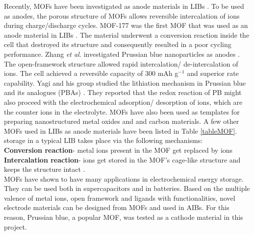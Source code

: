 Recently, MOFs have been investigated as anode materials in LIBs \cite{li_shape-controlled_2006,han_synthesis_2012,zhao_metalorganic_2015}. To be used as anodes, the porous structure of MOFs allows reversible intercalation of  ions during charge/discharge cycles. MOF-177 was the first MOF that was used as an anode material in LIBs \cite{}. The material underwent a conversion reaction inside the cell that destroyed its structure and consequently resulted in a poor cycling performance.  Zhang \textit{et al.} investigated Prussian blue nanoparticles as anodes \cite{nie_prussian_2014}. The open-framework structure allowed rapid intercalation/ de-intercalation of  ions. The cell achieved a reversible capacity of 300 mAh g$^{-1}$ and superior rate capability. Yagi and his group studied the lithiation mechanism in Prussian blue and its analogues (PBAs) \cite{yagi_eqcm_2014}. They reported that the redox reaction of PB might also proceed with the electrochemical adsorption/ desorption of  ions, which are the counter ions in the electrolyte. MOFs have also been used as templates for preparing nanostructured metal oxides and and carbon materials. A few other MOFs used in LIBs as anode materials have been listed in Table \ref{tableMOF}.  storage in a typical LIB takes place via the following mechanisms: \\

\textbf{Conversion reaction}- metal ions present in the MOF get replaced by  ions \\
\textbf{Intercalation reaction}-  ions get stored in the MOF's cage-like structure and keeps the structure intact \cite{wang_metalorganic_2016}. \\

MOFs have shown to have many applications in electrochemical energy storage. They can be used both in supercapacitors and in batteries. Based on the multiple valence of metal ions, open framework and ligands with functionalities, novel electrode materials can be designed from MOFs and used in AIBs. For this reason, Prussian blue, a popular MOF, was tested as a cathode material in this project. 


